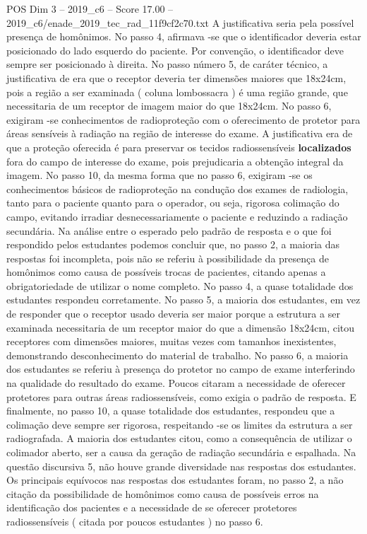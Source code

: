 \begin{textsample}{POS Dim 3 – 2019\_c6 – Score 17.00 – 2019\_c6/enade\_2019\_tec\_rad\_11f9cf2c70.txt}
A justificativa seria pela possível presença de homônimos.
No passo 4, afirmava -se que o identificador deveria estar posicionado do lado esquerdo do paciente.
Por convenção, o identificador deve sempre ser posicionado à direita.
No passo número 5, de caráter técnico, a justificativa de era que o receptor deveria ter dimensões maiores que 18x24cm, pois a região a ser examinada ( coluna lombossacra ) é uma região grande, que necessitaria de um receptor de imagem maior do que 18x24cm.
No passo 6, exigiram -se conhecimentos de radioproteção com o oferecimento de protetor para áreas sensíveis à radiação na região de interesse do exame.
A justificativa era de que a proteção oferecida é para preservar os tecidos radiossensíveis \textbf{localizados} fora do campo de interesse do exame, pois prejudicaria a obtenção integral da imagem.
No passo 10, da mesma forma que no passo 6, exigiram -se os conhecimentos básicos de radioproteção na condução dos exames de radiologia, tanto para o paciente quanto para o operador, ou seja, rigorosa colimação do campo, evitando irradiar desnecessariamente o paciente e reduzindo a radiação secundária.
Na análise entre o esperado pelo padrão de resposta e o que foi respondido pelos estudantes podemos concluir que, no passo 2, a maioria das respostas foi incompleta, pois não se referiu à possibilidade da presença de homônimos como causa de possíveis trocas de pacientes, citando apenas a obrigatoriedade de utilizar o nome completo.
No passo 4, a quase totalidade dos estudantes respondeu corretamente.
No passo 5, a maioria dos estudantes, em vez de responder que o receptor usado deveria ser maior porque a estrutura a ser examinada necessitaria de um receptor maior do que a dimensão 18x24cm, citou receptores com dimensões maiores, muitas vezes com tamanhos inexistentes, demonstrando desconhecimento do material de trabalho.
No passo 6, a maioria dos estudantes se referiu à presença do protetor no campo de exame interferindo na qualidade do resultado do exame.
Poucos citaram a necessidade de oferecer protetores para outras áreas radiossensíveis, como exigia o padrão de resposta.
E finalmente, no passo 10, a quase totalidade dos estudantes, respondeu que a colimação deve sempre ser rigorosa, respeitando -se os limites da estrutura a ser radiografada.
A maioria dos estudantes citou, como a consequência de utilizar o colimador aberto, ser a causa da geração de radiação secundária e espalhada.
Na questão discursiva 5, não houve grande diversidade nas respostas dos estudantes.
Os principais equívocos nas respostas dos estudantes foram, no passo 2, a não citação da possibilidade de homônimos como causa de possíveis erros na identificação dos pacientes e a necessidade de se oferecer protetores radiossensíveis ( citada por poucos estudantes ) no passo 6.

\end{textsample}
